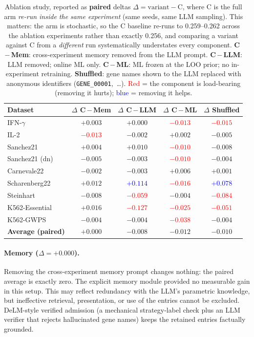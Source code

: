\documentclass[11pt]{article}
\newcommand{\drop}[1]{\textcolor{red}{#1}}
\newcommand{\gain}[1]{\textcolor{blue}{#1}}
\begin{document}
\begin{table}[H]
\centering
\caption{%
  Ablation study, reported as \textbf{paired} deltas $\Delta = \text{variant} - \text{C}$, where C is
  the full arm \emph{re-run inside the same experiment} (same seeds, same LLM sampling).
  This matters: the arm is stochastic, so the C baseline re-runs to 0.259--0.262 across the ablation
  experiments rather than exactly 0.256, and comparing a variant against C from a \emph{different}
  run systematically understates every component.
  \textbf{C\,$-$\,Mem}: cross-experiment memory removed from the LLM prompt.
  \textbf{C\,$-$\,LLM}: LLM removed; online ML only.
  \textbf{C\,$-$\,ML}: ML frozen at the LOO prior; no in-experiment retraining.
  \textbf{Shuffled}: gene names shown to the LLM replaced with anonymous identifiers
  (\texttt{GENE\_00001},~\ldots).
  \drop{Red} = the component is load-bearing (removing it hurts); \gain{blue} = removing it helps.
}
\label{tab:ablation}
\setlength{\tabcolsep}{7pt}
\begin{tabular}{lcccc}
\toprule
Dataset & $\Delta$ C\,$-$\,Mem & $\Delta$ C\,$-$\,LLM & $\Delta$ C\,$-$\,ML & $\Delta$ Shuffled \\
\midrule
IFN-$\gamma$   & $+0.003$ & $+0.000$ & \drop{$-0.013$} & \drop{$-0.015$} \\
IL-2           & \drop{$-0.013$} & $-0.002$ & $+0.002$ & $-0.005$ \\
Sanchez21       & $+0.004$ & $+0.010$ & \drop{$-0.010$} & $-0.008$ \\
Sanchez21 (dn) & $-0.005$ & $-0.003$ & \drop{$-0.010$} & $-0.004$ \\
Carnevale22    & $-0.002$ & $-0.003$ & $+0.006$ & $+0.001$ \\
Scharenberg22  & $+0.012$ & \gain{$+0.114$} & \drop{$-0.016$} & \gain{$+0.078$} \\
Steinhart      & $-0.008$ & \drop{$-0.059$} & $-0.004$ & \drop{$-0.084$} \\
K562-Essential & $+0.016$ & \drop{$-0.127$} & \drop{$-0.025$} & \drop{$-0.051$} \\
K562-GWPS      & $-0.004$ & $-0.004$ & \drop{$-0.038$} & $-0.004$ \\
\midrule
\textbf{Average (paired)} & $\mathbf{+0.000}$ & $\mathbf{-0.008}$ & $\mathbf{-0.012}$ & $\mathbf{-0.010}$ \\
\bottomrule
\end{tabular}
\end{table}

\paragraph{Memory ($\Delta = +0.000$).}
Removing the cross-experiment memory prompt changes nothing: the paired average is exactly zero.
The explicit memory module provided no measurable gain in this setup. This may reflect redundancy with
the LLM's parametric knowledge, but ineffective retrieval, presentation, or use of the entries cannot be
excluded. DeLM-style verified admission (a mechanical strategy-label check plus an LLM verifier that
rejects hallucinated gene names) keeps the retained entries factually grounded.
\end{document}
